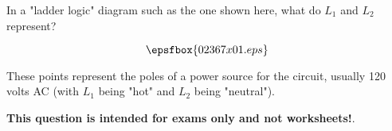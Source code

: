 

In a "ladder logic" diagram such as the one shown here, what do $L_1$ and $L_2$ represent?

$$\epsfbox{02367x01.eps}$$







These points represent the poles of a power source for the circuit, usually 120 volts AC (with $L_1$ being "hot" and $L_2$ being "neutral").







{\bf This question is intended for exams only and not worksheets!}.




